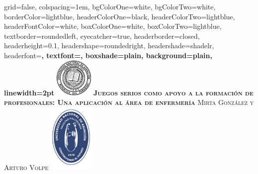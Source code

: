 \documentclass[portrait,final,a0paper,fontscale=0.277]{baposter}
\begin{document}
\begin{poster}%
  {
  grid=false,
  colspacing=1em,
  bgColorOne=white,
  bgColorTwo=white,
  borderColor=lightblue,
  headerColorOne=black,
  headerColorTwo=lightblue,
  headerFontColor=white,
  boxColorOne=white,
  boxColorTwo=lightblue,
  textborder=roundedleft,
  eyecatcher=true,
  headerborder=closed,
  headerheight=0.1\textheight,
  headershape=roundedright,
  headershade=shadelr,
  headerfont=\Large\bf\textsc, %
  textfont={\setlength{\parindent}{1.5em}},
  boxshade=plain,
  background=plain,
  linewidth=2pt
  }
  {\includegraphics[height=5em]{imagenes/logouna.png}} 
  {\bf\textsc{Juegos serios como apoyo a la formación de profesionales: Una aplicación al área de enfermería}\vspace{0.5em}}
  {\textsc{ Mirta González y Arturo Volpe }}
  {%
    \includegraphics[height=9.0em]{imagenes/logopol.png}
  }

    \newcommand{\colouredcircle}{%
      \tikz{\useasboundingbox (-0.2em,-0.32em) rectangle(0.2em,0.32em); \draw[draw=black,fill=lightblue,line width=0.03em] (0,0) circle(0.18em);}}


\end{poster}
\end{document}

